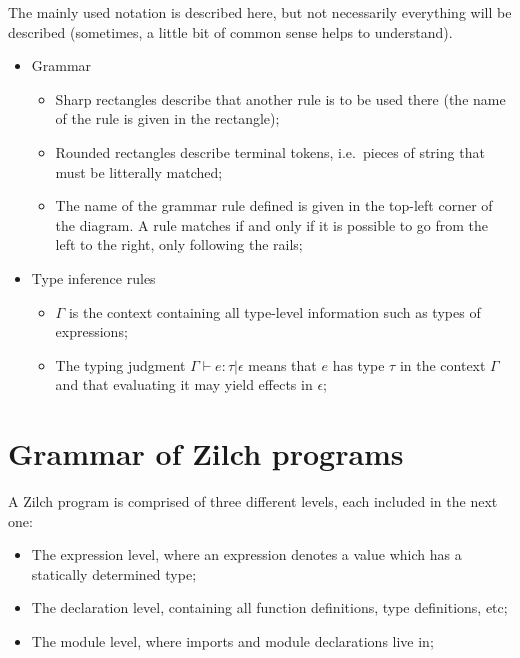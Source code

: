 The mainly used notation is described here, but not necessarily everything will be described (sometimes, a little bit of common sense helps to understand).

\begin{itemize}
	\item Grammar
	      \begin{figure}[H]
		      \centering
	      \end{figure}
	      \begin{itemize}
		      \item Sharp rectangles describe that another rule is to be used there (the name of the rule is given in the rectangle);
		      \item Rounded rectangles describe terminal tokens, i.e.\ pieces of string that must be litterally matched;
		      \item The name of the grammar rule defined is given in the top-left corner of the diagram.
		            A rule matches if and only if it is possible to go from the left to the right, only following the rails;
	      \end{itemize}
	\item Type inference rules
	      \begin{itemize}
		      \item $\Gamma$ is the context containing all type-level information such as types of expressions;
		      \item The typing judgment $\Gamma \vdash e : \tau \vert \epsilon$ means that $e$ has type $\tau$ in the context $\Gamma$ and that evaluating it may yield effects in $\epsilon$;
	      \end{itemize}
\end{itemize}

\chapter{Grammar of Zilch programs}\label{chap:zilch-grammar}

A Zilch program is comprised of three different levels, each included in the next one:
\begin{itemize}
	\item The expression level, where an expression denotes a value which has a statically determined type;
	\item The declaration level, containing all function definitions, type definitions, etc;
	\item The module level, where imports and module declarations live in;
\end{itemize}

